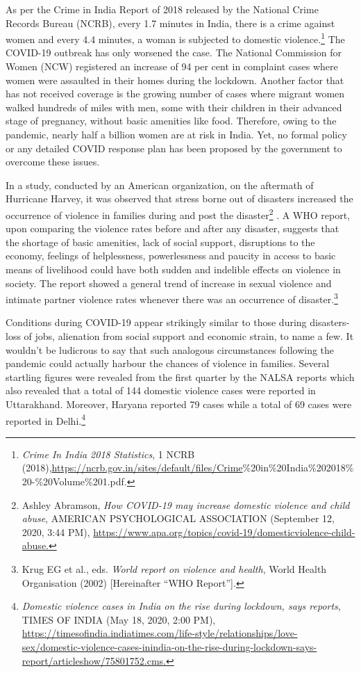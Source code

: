 \begin{multicols}{2}
\noi
As per the Crime in India Report of 2018 released by the National Crime Records Bureau
(NCRB), every 1.7 minutes in India, there is a crime against women and every 4.4 minutes, a
woman is subjected to domestic violence.\footnote{\textit{Crime In India 2018 Statistics}, 1 NCRB (2018),\url{https://ncrb.gov.in/sites/default/files/Crime}\%20in\%20India\%202018\%20-\%20Volume\%201.pdf.}
 The COVID-19 outbreak has only worsened the
case. The National Commission for Women (NCW) registered an increase of 94 per cent in
complaint cases where women were assaulted in their homes during the lockdown. Another
factor that has not received coverage is the growing number of cases where migrant women
walked hundreds of miles with men, some with their children in their advanced stage of
pregnancy, without basic amenities like food. Therefore, owing to the pandemic, nearly half a
billion women are at risk in India. Yet, no formal policy or any detailed COVID response
plan has been proposed by the government to overcome these issues.
 
 
 \noi
In a study, conducted by an American organization, on the aftermath of Hurricane Harvey, it
was observed that stress borne out of disasters increased the occurrence of violence in
families during and post the disaster\footnote{Ashley Abramson, \textit{How COVID-19 may increase domestic violence and child abuse}, AMERICAN
PSYCHOLOGICAL ASSOCIATION (September 12, 2020, 3:44 PM), \url{https://www.apa.org/topics/covid-19/domesticviolence-child-abuse.}}
. A WHO report, upon comparing the violence rates
before and after any disaster, suggests that the shortage of basic amenities, lack of social
support, disruptions to the economy, feelings of helplessness, powerlessness and paucity in
access to basic means of livelihood could have both sudden and indelible effects on violence
in society. The report showed a general trend of increase in sexual violence and intimate
partner violence rates whenever there was an occurrence of disaster.\footnote{Krug EG et al., eds. \textit{World report on violence and health}, World Health Organisation (2002) [Hereinafter
“WHO Report”].} 
 
 \noi
Conditions during COVID-19 appear strikingly similar to those during disasters- loss of jobs,
alienation from social support and economic strain, to name a few. It wouldn’t be ludicrous to
say that such analogous circumstances following the pandemic could actually harbour the
chances of violence in families. Several startling figures were revealed from the first quarter
by the NALSA reports which also revealed that a total of 144 domestic violence cases were reported in Uttarakhand. Moreover, Haryana reported 79 cases while a total of 69 cases were
reported in Delhi.\footnote{\textit{Domestic violence cases in India on the rise during lockdown, says reports}, TIMES OF INDIA (May 18, 2020,
2:00 PM), \url{https://timesofindia.indiatimes.com/life-style/relationships/love-sex/domestic-violence-cases-inindia-on-the-rise-during-lockdown-says-report/articleshow/75801752.cms.}}



\end{multicols}

